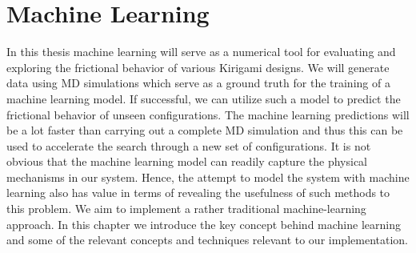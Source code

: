 \chapter{Machine Learning}
In this thesis machine learning will serve as a numerical tool for evaluating
and exploring the frictional behavior of various Kirigami designs. We will
generate data using \acrshort{MD} simulations which serve as a ground truth for
the training of a machine learning model. If successful, we can utilize such a
model to predict the frictional behavior of unseen configurations. The machine
learning predictions will be a lot faster than carrying out a complete
\acrshort{MD} simulation and thus this can be used to accelerate the search
through a new set of configurations. It is not obvious that the machine learning
model can readily capture the physical mechanisms in our system. Hence, the
attempt to model the system with machine learning also has value in terms of
revealing the usefulness of such methods to this problem. We aim to implement a
rather traditional machine-learning approach. In this chapter we introduce the
key concept behind machine learning and some of the relevant concepts and
techniques relevant to our implementation.


